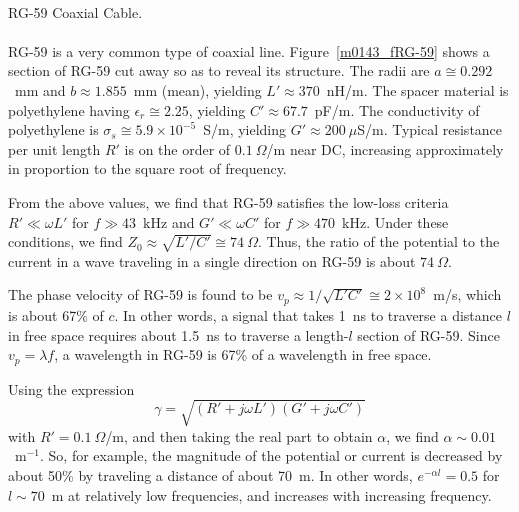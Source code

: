 ~\\ \begin{example} 
\begin{mdframed}[backgroundcolor=brown!20,linecolor=brown!20]\raggedright 
RG-59 
Coaxial Cable. 
\\~\\
RG-59 is a very common type of coaxial line.
Figure~\ref{m0143_fRG-59} shows a section of RG-59 cut away so as to reveal its structure.
The radii are $a\cong 0.292$~mm and $b\approx 1.855$~mm (mean), yielding $L'\approx 370$~nH/m.
The spacer material is polyethylene having $\epsilon_r\cong 2.25$, yielding $C'\approx 67.7$~pF/m.
The conductivity of polyethylene is $\sigma_s\cong 5.9 \times 10^{-5}$~S/m, yielding $G'\approx 200~\mu$S/m.
Typical resistance per unit length $R'$ is on the order of $0.1~\Omega$/m near DC, increasing approximately in proportion to the square root of frequency. 

From the above values, we find that RG-59 satisfies the low-loss criteria 
$R'\ll\omega L'$ for $f\gg 43$~kHz and 
$G'\ll\omega C'$ for $f\gg 470$~kHz.
Under these conditions, we find $Z_0 \approx \sqrt{L'/C'} \cong 74~\Omega$.    
Thus, the ratio of the potential to the current in a wave traveling in a single direction on RG-59 is about $74~\Omega$.

The phase velocity of RG-59 is found to be $v_p \approx 1/\sqrt{L'C'} \cong 2 \times 10^8$~m/s, which is about 67\% of $c$.  In other words, a signal that takes 1~ns to traverse a distance $l$ in free space requires about 1.5~ns to traverse a length-$l$ section of RG-59. 
Since $v_p = \lambda f$, a wavelength in RG-59 is 67\% of a wavelength in free space.

Using the expression 
%
\begin{equation}
\gamma = \sqrt{\left(R'+j\omega L'\right)\left(G'+j\omega C'\right)}
\end{equation} 
%
with $R'=0.1~\Omega$/m, and then taking the real part to obtain $\alpha$, we find $\alpha\sim 0.01$~m$^{-1}$.  So, for example, the magnitude of the potential or current is decreased by about 50\% by traveling a distance of about 70~m. 
In other words, $e^{-\alpha l} = 0.5$ for $l \sim 70$~m at relatively low frequencies, and increases with increasing frequency.    

\end{mdframed} 


\end{example}
